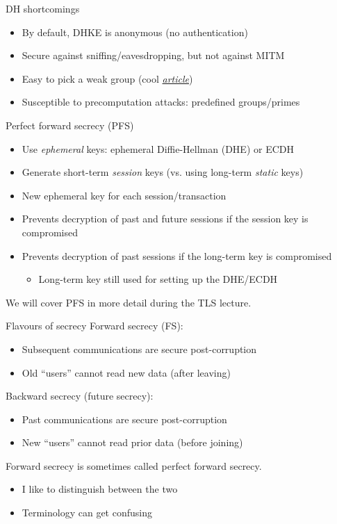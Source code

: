 \begin{frame}{DH shortcomings}
  \begin{itemize}[<+(1)->]
    \item By default, DHKE is anonymous (no authentication)
    \item Secure against sniffing/eavesdropping, but not against MITM
    \item Easy to pick a weak group (cool \href{https://weakdh.org/imperfect-forward-secrecy-ccs15.pdf}{\textit{article}})
    \item Susceptible to precomputation attacks: predefined groups/primes
  \end{itemize}
\end{frame}

\begin{frame}{Perfect forward secrecy (PFS)}
  \begin{itemize}[<+->]
    \item Use \emph{ephemeral} keys: ephemeral Diffie-Hellman (DHE) or ECDH
    \item Generate short-term \emph{session} keys (vs. using long-term \emph{static} keys)
    \item New ephemeral key for each session/transaction
    \item Prevents decryption of past and future sessions if the session key is compromised
    \item Prevents decryption of past sessions if the long-term key is compromised
    \begin{itemize}
      \item Long-term key still used for setting up the DHE/ECDH
    \end{itemize}
  \end{itemize}

  \pause
  We will cover PFS in more detail during the TLS lecture.
\end{frame}

\iffalse
\begin{frame}{Flavours of secrecy}
  \pause
  Forward secrecy (FS):
  \begin{itemize}[<+(1)->]
    \item Subsequent communications are secure post-corruption
    \item Old \enquote{users} cannot read new data (after leaving)
  \end{itemize}

  \pause
  Backward secrecy (future secrecy):
  \begin{itemize}[<+(1)->]
    \item Past communications are secure post-corruption
    \item New \enquote{users} cannot read prior data (before joining)    
  \end{itemize}

  \pause
  Forward secrecy is sometimes called perfect forward secrecy.
  \begin{itemize}
    \item I like to distinguish between the two
    \item Terminology can get confusing
  \end{itemize} 
\end{frame}

